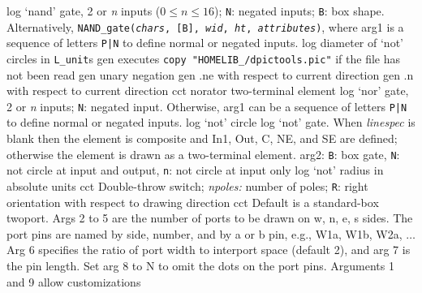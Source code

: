 %
  {log}%
  {`nand' gate, 2 or {\sl n\/} inputs ($0 \leq n \leq 16$);
   {\tt N}: negated inputs; {\tt B}: box shape.
   Alternatively, {\tt NAND\_gate({\sl chars}, [B], {\sl wid},
    {\sl ht}, {\sl attributes})}, where
   arg1 is a sequence of letters {\tt P|N} to define
   normal or negated inputs.
    }%
%
  {log}%
  {diameter of `not' circles in {\tt L\_unit}s}%
%
  {gen}%
  {executes {\tt copy "HOMELIB\_/dpictools.pic"} if the file has
  not been read}%
%
  {gen}%
  {unary negation}%
%
  {gen}%
  {.ne with respect to current direction}%
%
  {gen}%
  {.n with respect to current direction}%
%
  {cct}%
  { norator two-terminal element }%
%
  {log}%
  {`nor' gate, 2 or {\sl n\/} inputs; {\tt N}: negated input.
   Otherwise, arg1 can be a sequence of letters {\tt P|N} to define
   normal or negated inputs.
    }%
%
  {log}%
  {`not' circle}%
%
  {log}%
  {`not' gate.
   When {\sl linespec} is blank then the element is composite and In1,
   Out, C, NE, and SE are defined; otherwise the element is drawn as a
   two-terminal element. arg2: {\tt B}: box gate, {\tt N}: not circle at
   input and output, {\tt n}: not circle at input only
    }%
%
  {log}%
  {`not' radius in absolute units}%
%
  {cct}%
  {Double-throw switch; {\sl npoles:} number of poles;
   {\tt R}: right orientation with respect to drawing direction
   }%
%
  {cct}%
  { Default is a standard-box twoport.  Args 2 to 5 are
    the number of ports to be drawn on w, n, e, s sides.  The port pins
    are named by side, number, and by a or b pin, e.g., W1a, W1b, W2a,
    $\ldots$ Arg 6 specifies the ratio of port width to interport space
    (default 2), and arg 7 is the pin length.  Set arg 8 to N to omit
    the dots on the port pins. Arguments 1 and 9 allow customizations
   }%
%
